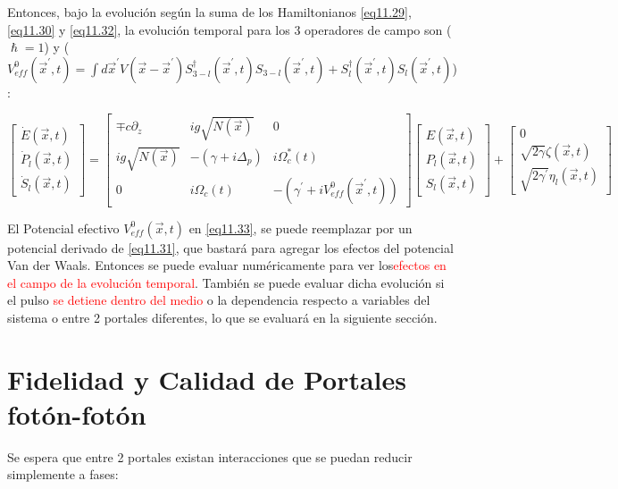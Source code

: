 \documentclass{book}
\begin{document}
Entonces, bajo la evolución según la suma de los Hamiltonianos \ref{eq11.29},\ref{eq11.30} y \ref{eq11.32}, la evolución temporal para los 3 operadores de campo son ($\hslash=1$) y ($V_{eff}^0(\vec{x}^\prime, t)=  \int d\vec{x}^\prime V(\vec{x}-\vec{x}^\prime)S_{3-l}^\dag(\vec{x}^\prime,t)S_{3-l}(\vec{x}^\prime,t)+S_l^\dag(\vec{x}^\prime,t)S_l(\vec{x}^\prime,t)$) :

\begin{equation}\label{eq11.33}\begin{bmatrix}\dot{E}(\vec{x},t)\\\dot{P}_l(\vec{x},t)\\\dot{S}_l(\vec{x},t)\end{bmatrix}=\begin{bmatrix} \mp c\partial_z & ig\sqrt{N(\vec{x})}&0  \\ ig\sqrt{N(\vec{x})}&-(\gamma+i\Delta_p) & i\Omega_c^*(t) \\ 0&i\Omega_c(t) &-(\gamma^\prime +i V_{eff}^0(\vec{x}^\prime,t)) \end{bmatrix}\begin{bmatrix}E(\vec{x},t)\\P_l(\vec{x},t)\\S_l(\vec{x},t)\end{bmatrix}+\begin{bmatrix}0\\\sqrt{2\gamma}\zeta(\vec{x},t)\\\sqrt{2\gamma^\prime}\eta_l(\vec{x},t)\end{bmatrix}\end{equation}

El Potencial efectivo $V_{eff}^0(\vec{x},t)$ en \ref{eq11.33}, se puede reemplazar por un potencial derivado de \ref{eq11.31}, que bastará para agregar los efectos del potencial Van der Waals. Entonces se puede evaluar numéricamente para ver los\textcolor{red}{efectos en el campo de la evolución temporal}. También se puede evaluar dicha evolución si  el pulso \textcolor{red}{se detiene dentro del medio} o la dependencia respecto a variables del sistema o entre 2 portales diferentes, lo que se evaluará en la siguiente sección.

\section{Fidelidad y Calidad de Portales fotón-fotón}

Se espera que entre 2 portales existan interacciones que se puedan reducir simplemente a fases:
\end{document}
